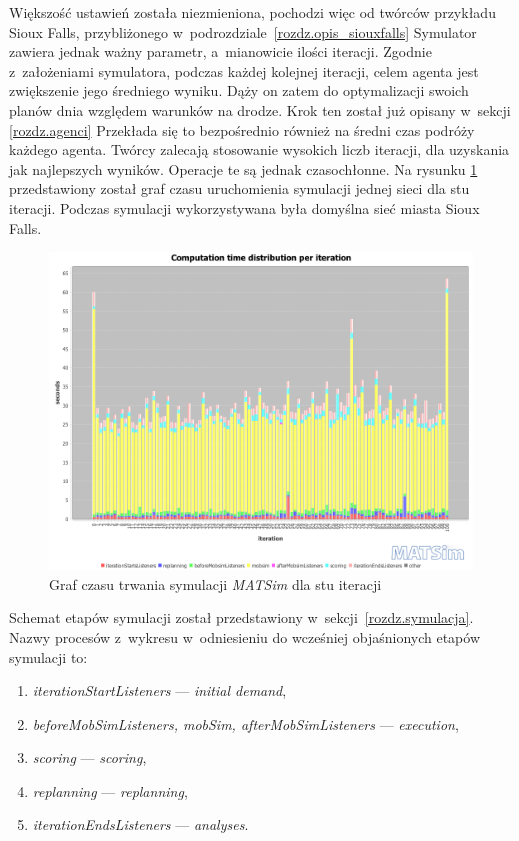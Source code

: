\documentclass[twoside,12pt]{report}
\begin{document}
Większość ustawień została niezmieniona, pochodzi więc od twórców przykładu Sioux Falls, przybliżonego w~podrozdziale~\ref{rozdz.opis_siouxfalls} Symulator zawiera jednak ważny parametr, a~mianowicie ilości iteracji. Zgodnie z~założeniami symulatora, podczas każdej kolejnej iteracji, celem agenta jest zwiększenie jego średniego wyniku. Dąży on zatem do optymalizacji swoich planów dnia względem warunków na drodze. Krok ten został już opisany w~sekcji \ref{rozdz.agenci} Przekłada się to bezpośrednio również na średni czas podróży każdego agenta. Twórcy zalecają stosowanie wysokich liczb iteracji, dla uzyskania jak najlepszych wyników. Operacje te są jednak czasochłonne. Na rysunku \ref{fig:symulacja_czas} przedstawiony został graf czasu uruchomienia symulacji jednej sieci dla stu iteracji. Podczas symulacji wykorzystywana była domyślna sieć miasta Sioux Falls.

\begin{figure}[htbp]
	\centering
	\includegraphics[width=\textwidth]{img/def_stopwatch}
	\caption{Graf czasu trwania symulacji \textit{MATSim} dla stu iteracji}
	\label{fig:symulacja_czas}
\end{figure}

Schemat etapów symulacji został przedstawiony w~sekcji~\ref{rozdz.symulacja}. Nazwy procesów z~wykresu w~odniesieniu do wcześniej objaśnionych etapów symulacji to:
\begin{enumerate}
\item \textit{iterationStartListeners} --- \textit{initial demand},
\item \textit{beforeMobSimListeners, mobSim, afterMobSimListeners} --- \textit{execution}, 
\item \textit{scoring} --- \textit{scoring},
\item \textit{replanning} --- \textit{replanning},
\item \textit{iterationEndsListeners} --- \textit{analyses}.
\end{enumerate}
\end{document}
